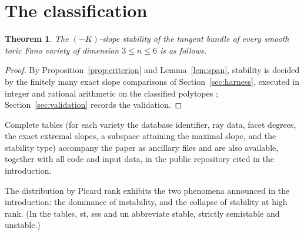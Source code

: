\documentclass[11pt]{amsart}
\newtheorem{theorem}{Theorem}[section]
\theoremstyle{definition}
\theoremstyle{remark}
\begin{document}
\section{The classification}\label{sec:results}

\begin{theorem}\label{thm:main}
The $(-K)$-slope stability of the tangent bundle of every smooth toric
Fano variety of dimension $3 \le n \le 6$ is as follows.
\begin{center}
\end{center}
\end{theorem}

\begin{proof}
By Proposition~\ref{prop:criterion} and Lemma~\ref{lem:span}, stability
is decided by the finitely many exact slope comparisons of
Section~\ref{sec:harness}, executed in integer and rational arithmetic
on the classified polytopes \cite{Obro2007,polyDB};
Section~\ref{sec:validation} records the validation.
\end{proof}

Complete tables (for each variety the database identifier, ray data,
facet degrees, the exact extremal slopes, a subspace attaining the
maximal slope, and the stability type) accompany the paper as ancillary
files and are also available, together with all code and input data, in the
public repository cited in the introduction.

The distribution by Picard rank exhibits the two phenomena announced in
the introduction: the dominance of instability, and the collapse of
stability at high rank. (In the tables, st, sss and un abbreviate
stable, strictly semistable and unstable.)
\end{document}
